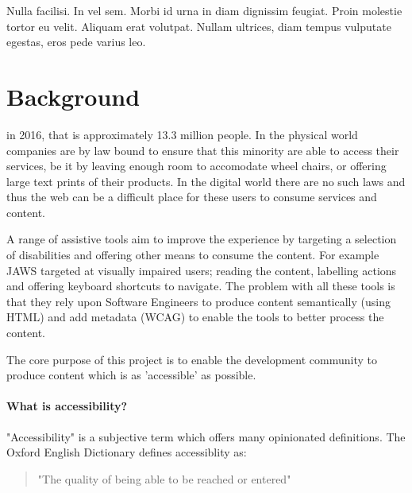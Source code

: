 \begin{savequote}[75mm]
Nulla facilisi. In vel sem. Morbi id urna in diam dignissim feugiat. Proin molestie tortor eu velit. Aliquam erat volutpat. Nullam ultrices, diam tempus vulputate egestas, eros pede varius leo.
\end{savequote}

\chapter{Background}
 in
2016, that is
approximately 13.3 million people. In the physical world companies are by law
bound to ensure that this minority are able to access their services, be it by
leaving enough room to accomodate wheel chairs, or offering large text prints
of their products. In the digital world there are no such laws and thus the web can be a
difficult place for these users to consume services and content.

A range of assistive
tools aim to improve the experience by targeting a selection of
disabilities and offering other means to consume the content. For example
JAWS targeted at visually impaired users; reading the content,
labelling actions and offering keyboard shortcuts to navigate. The
problem
with all these tools is that they rely upon Software Engineers to produce
content semantically (using HTML) and add metadata (WCAG) to enable the tools
to better process the content.

The core purpose of this project is to enable the development community to
produce content which is as 'accessible' as possible.

\subsubsection{What is accessibility?}
"Accessibility" is a subjective term which offers many opinionated
definitions. The Oxford English Dictionary defines accessiblity as:
\begin{quote}
"The quality of being able to be reached or entered"
\end{quote}

